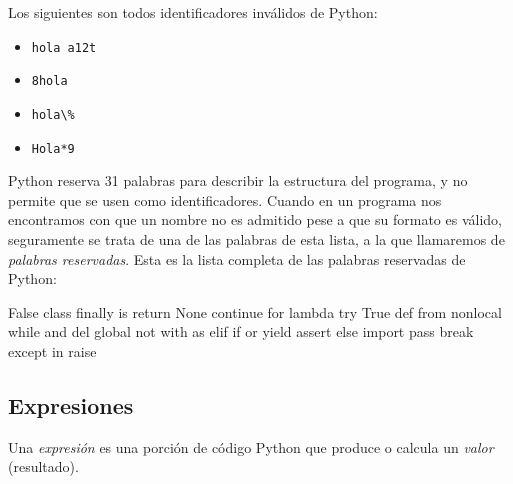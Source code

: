 Los siguientes son todos identificadores inválidos de Python:

\begin{itemize}[noitemsep]
\item \lstinline!hola a12t!
\item \lstinline!8hola!
\item \lstinline!hola\%!
\item \lstinline!Hola*9!
\end{itemize}

Python reserva 31 palabras para describir la estructura del
programa, y no permite que se usen como identificadores. Cuando en
un programa nos encontramos con que un nombre no es admitido pese
a que su formato es válido, seguramente se trata de una de las
palabras de esta lista, a la que llamaremos de \emph{palabras
reservadas}. Esta es la lista completa de las palabras reservadas de
Python:

\begin{codigo-nohl-sn}
False      class      finally    is         return
None       continue   for        lambda     try
True       def        from       nonlocal   while
and        del        global     not        with
as         elif       if         or         yield
assert     else       import     pass
break      except     in         raise
\end{codigo-nohl-sn}

\subsection{Expresiones}
Una \emph{expresión} es una porción de código Python que produce o
calcula un \emph{valor} (resultado).

